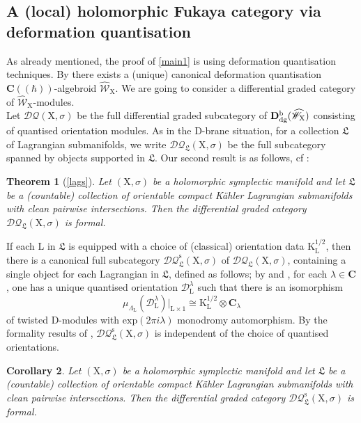 \documentclass{article}
\theoremstyle{plain}
\newtheorem{theorem}{Theorem}[subsection]   %
\newtheorem{corollary}[theorem]{Corollary}
\theoremstyle{definition}
\theoremstyle{remark}
\newcommand{\Db}{{\mathrm{\bf{D}}}^{\mr{b}}}
\newcommand{\mr}{\mathrm}
\newcommand{\C}{\mathbf C}
\newcommand{\cbrak}{(\!(\hbar)\!)}
\newcommand{\3}{\vspace{3mm}}
\newcommand{\2}{\vspace{2mm}}
\newcommand{\1}{\vspace{1mm}}
\begin{document}
\subsection{A (local) holomorphic Fukaya category via deformation quantisation}

As already mentioned, the proof of \cref{main1} is using deformation quantisation techniques. By \cite{10.1155/S1073792804132819} there exists a (unique) canonical deformation quantisation $\C\cbrak$-algebroid $\widehat{\mathscr{W}}_\mr{X}$. We are going to consider a differential graded category of $\widehat{\mathscr{W}}_\mr{X}$-modules.\\
Let $\mathcal{DQ}(\mr{X},\sigma)$ be the full differential graded subcategory of $\Db_{\mr{dg}}(\widehat{\mathscr{W}}_\mr{X})$ consisting of quantised orientation modules. As in the D-brane situation, for a collection $\mathfrak{L}$ of Lagrangian submanifolds, we write $\mathcal{DQ}_\mathfrak{L}(\mr{X},\sigma)$ be the full subcategory spanned by objects supported in $\mathfrak{L}$. Our second result is as follows, cf \cite[Conjecture~0.3.4]{MR4678893}:
\2
\begin{theorem}[\cref{lags}]\label{main2}
Let $(\mr{X},\sigma)$ be a holomorphic symplectic manifold and let $\mathfrak{L}$ be a (countable) collection of orientable compact K\"{a}hler Lagrangian submanifolds with clean pairwise intersections. Then the differential graded category $\mathcal{DQ}_\mathfrak{L}(\mr{X},\sigma)$ is formal.
\end{theorem}
If each $\mr{L}$ in $\mathfrak{L}$ is equipped with a choice of (classical) orientation data $\mr{K}_\mr{L}^{1/2}$, then there is a canonical full subcategory $\mathcal{DQ}^{\mr{s}}_\mathfrak{L}(\mr{X},\sigma)$ of $\mathcal{DQ}_\mathfrak{L}(\mr{X},\sigma)$, containing a single object for each Lagrangian in $\mathfrak{L}$, defined as follows; by \cite{MR2331247} and \cite{saf}, for each $\lambda	\in \C$, one has a unique quantised orientation $\mathscr{D}^\lambda_\mr{L}$ such that there is an isomorphism $$\mu_{\Lambda_\mr{L}}\left(\mathscr{D}^\lambda_\mr{L}\right)|_{\mr{L}\times 1}\cong \mr{K}_\mr{L}^{1/2}\otimes \C_\lambda$$ of twisted $\mr{D}$-modules with $\mr{exp}(2\pi i \lambda)$ monodromy automorphism. By the formality results of \cite{MR4678893}, $\mathcal{DQ}^{\mr{s}}_\mathfrak{L}(\mr{X},\sigma)$ is independent of the choice of quantised orientations.
\2 
\begin{corollary}\label{main2a}
Let $(\mr{X},\sigma)$ be a holomorphic symplectic manifold and let $\mathfrak{L}$ be a (countable) collection of orientable compact K\"{a}hler Lagrangian submanifolds with clean pairwise intersections. Then the differential graded category $\mathcal{DQ}^\mr{s}_\mathfrak{L}(\mr{X},\sigma)$ is formal.
\end{corollary}
\end{document}
